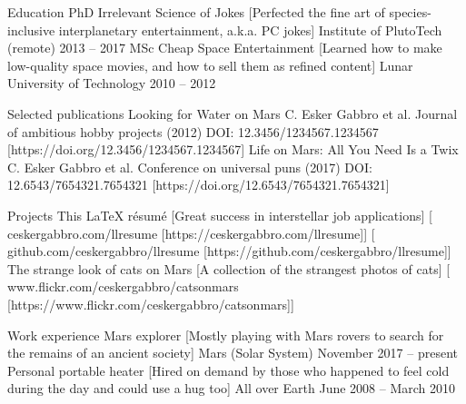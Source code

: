 \documentclass[
]{llresume}
\begin{document}
\begin{mainsection}{Education}
    \entryJob
        {PhD Irrelevant Science of Jokes}
        [Perfected the fine art of species-inclusive interplanetary
        entertainment, a.k.a. PC jokes]
        {Institute of PlutoTech (remote)}
        {2013 -- 2017}
    \entryJob
        {MSc Cheap Space Entertainment}
        [Learned how to make low-quality space movies, and how to sell them
        as refined content]
        {Lunar University of Technology}
        {2010 -- 2012}
\end{mainsection}

\begin{mainsection}{Selected publications}
    \entryPub
        {Looking for Water on Mars}
        {C. Esker Gabbro et al.}
        {Journal of ambitious hobby projects (2012)}
        {DOI: 12.3456/1234567.1234567}
        [https://doi.org/12.3456/1234567.1234567]
    \entryPub
        {Life on Mars: All You Need Is a Twix}
        {C. Esker Gabbro et al.}
        {Conference on universal puns (2017)}
        {DOI: 12.6543/7654321.7654321}
        [https://doi.org/12.6543/7654321.7654321]
\end{mainsection}

\begin{mainsection}{Projects}
    \entryGeneric
        {This LaTeX r\'esum\'e}
        [Great success in interstellar job applications]
        [\infoHomepage
            {ceskergabbro.com/llresume}
            [https://ceskergabbro.com/llresume]]
        [\infoGithub
            {github.com/ceskergabbro/llresume}
            [https://github.com/ceskergabbro/llresume]]
    \entryGeneric
        {The strange look of cats on Mars}
        [A collection of the strangest photos of cats]
        [\infoFlickr
            {www.flickr.com/ceskergabbro/catsonmars}
            [https://www.flickr.com/ceskergabbro/catsonmars]]
\end{mainsection}

\begin{mainsection}{Work experience}
    \entryJob
        {Mars explorer}
        [Mostly playing with Mars rovers to search for the remains of an
        ancient society]
        {Mars (Solar System)}
        {November 2017 -- present}
    \entryJob
        {Personal portable heater}
        [Hired on demand by those who happened to feel cold during the
        day and could use a hug too]
        {All over Earth}
        {June 2008 -- March 2010}
\end{mainsection}
\end{document}
